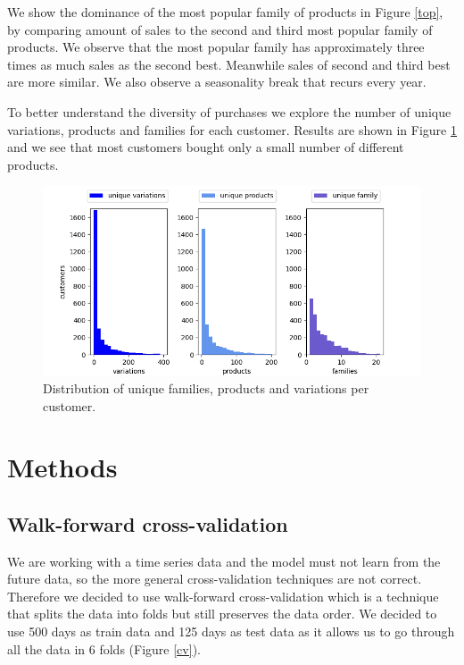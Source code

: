 \documentclass[fleqn,moreauthors,10pt]{ds_report}
\begin{document}
\noindent We show the dominance of the most popular family of products in Figure \ref{top}, by comparing amount of sales to the second and third most popular family of products. We observe that the most popular family has approximately three times as much sales as the second best. Meanwhile sales of second and third best are more similar. We also observe a seasonality break that recurs every year.

\noindent To better understand the diversity of purchases we explore the number of unique variations, products and families for each customer. Results are shown in Figure \ref{unique} and we see that most customers bought only a small number of different products.

\begin{figure}[H]\centering
	\includegraphics[width=\linewidth]{unique.png}
	\caption{Distribution of unique families, products and variations per customer.}
	\label{unique}
\end{figure}

\section*{Methods}

\subsection*{Walk-forward cross-validation}

\noindent We are working with a time series data and the model must not learn from the future data, so the more general cross-validation techniques are not correct. Therefore we decided to use walk-forward cross-validation which is a technique that splits the data into folds but still preserves the data order. We decided to use 500 days as train data and 125 days as test data as it allows us to go through all the data in 6 folds (Figure \ref{cv}). 
\end{document}
